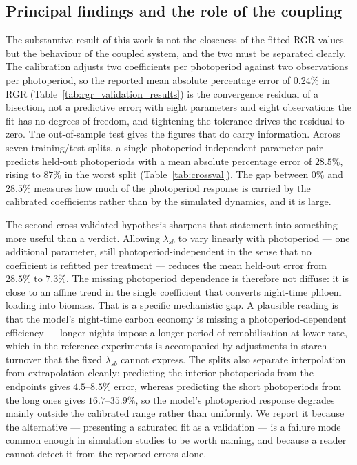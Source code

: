 \documentclass[a4paper,fleqn]{cas-sc}
\begin{document}
\subsection{Principal findings and the role of the coupling}

The substantive result of this work is not the closeness of the fitted RGR
values but the behaviour of the coupled system, and the two must be separated
clearly. The calibration adjusts two coefficients per photoperiod against two
observations per photoperiod, so the reported mean absolute percentage error
of $0.24\%$ in RGR (Table~\ref{tab:rgr_validation_results}) is the
convergence residual of a bisection, not a predictive error; with eight
parameters and eight observations the fit has no degrees of freedom, and
tightening the tolerance drives the residual to zero. The out-of-sample test
gives the figures that do carry information. Across seven training/test splits,
a single photoperiod-independent parameter pair predicts held-out photoperiods
with a mean absolute percentage error of $28.5\%$, rising to $87\%$ in the
worst split (Table~\ref{tab:crossval}). The gap between $0\%$ and $28.5\%$
measures how much of the photoperiod response is carried by the calibrated
coefficients rather than by the simulated dynamics, and it is large.

The second cross-validated hypothesis sharpens that statement into something
more useful than a verdict. Allowing $\lambda_{sb}$ to vary linearly with
photoperiod --- one additional parameter, still photoperiod-independent in the
sense that no coefficient is refitted per treatment --- reduces the mean
held-out error from $28.5\%$ to $7.3\%$. The missing photoperiod dependence is
therefore not diffuse: it is close to an affine trend in the single coefficient
that converts night-time phloem loading into biomass. That is a specific
mechanistic gap. A plausible reading is that the model's night-time carbon
economy is missing a photoperiod-dependent efficiency --- longer nights impose
a longer period of remobilisation at lower rate, which in the reference
experiments is accompanied by adjustments in starch turnover that the fixed
$\lambda_{sb}$ cannot express. The splits also separate interpolation from
extrapolation cleanly: predicting the interior photoperiods from the endpoints
gives $4.5$--$8.5\%$ error, whereas predicting the short photoperiods from the
long ones gives $16.7$--$35.9\%$, so the model's photoperiod response degrades
mainly outside the calibrated range rather than uniformly. We report it because the alternative --- presenting a saturated fit as
a validation --- is a failure mode common enough in simulation studies to be
worth naming, and because a reader cannot detect it from the reported errors
alone.
\end{document}
